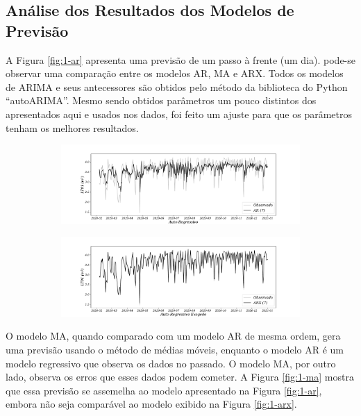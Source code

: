 

\subsection{An\'alise dos Resultados dos Modelos de Previs\~ao}

A Figura \ref{fig:1-ar} apresenta uma previsão de um passo à frente (um dia).  pode-se observar uma comparação entre os modelos AR, MA e ARX.
Todos os modelos de ARIMA e seus antecessores são obtidos pelo método da biblioteca do Python ``autoARIMA''. Mesmo sendo obtidos parâmetros um pouco distintos dos apresentados aqui e usados nos dados, foi feito um ajuste para que os parâmetros tenham os melhores resultados.



\begin{figure}[H]
	\centering
	\caption{Comparação dos modelos AR e ARX \label{fig:1-ar} \label{fig:1-arx}}
	\begin{subfigure}{1\textwidth}
		\includegraphics[width=\linewidth]{Modelos/Figuras/AR}
		
		
	\end{subfigure}
	
	\begin{subfigure}{1\textwidth}
		\includegraphics[width=\linewidth]{Modelos/Figuras/ARX}
		
		
	\end{subfigure}
	
	
\end{figure}

O modelo MA, quando comparado com um modelo AR de mesma ordem, gera uma previsão usando o método de médias móveis, enquanto o modelo AR é um modelo regressivo que observa os dados no passado. O modelo MA, por outro lado, observa os erros que esses dados podem cometer. A Figura \ref{fig:1-ma} mostra que essa previsão se assemelha ao modelo apresentado na Figura \ref{fig:1-ar}, embora não seja comparável ao modelo exibido na Figura \ref{fig:1-arx}.

